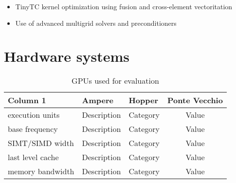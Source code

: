 \documentclass[a4paper,12pt]{article}
\begin{document}
\begin{itemize}
    \item TinyTC kernel optimization using fusion and cross-element vectoritation
    \item Use of advanced multigrid solvers and preconditioners
\end{itemize}


\section{Hardware systems}

\begin{center}
    \begin{table}[h!]
    \small
    \caption{GPUs used for evaluation}
    \renewcommand{\arraystretch}{1.25}
    \label{tab:example_table}
    \begin{tabular}{|l|l|l|c|}
    \hline
    \textbf{Column 1} & \textbf{Ampere} & \textbf{Hopper} & \textbf{Ponte Vecchio} \\
    \hline
    execution units & Description & Category & Value \\
    base frequency & Description & Category & Value \\
    SIMT/SIMD width & Description & Category & Value \\
    last level cache & Description & Category & Value \\
    memory bandwidth & Description & Category & Value \\
    \hline
    \end{tabular}
    \end{table}
\end{center}
\end{document}
